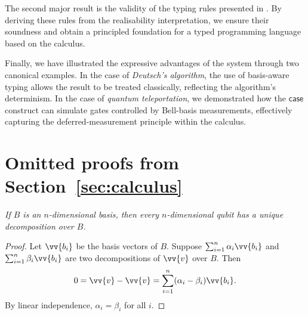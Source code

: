 \documentclass[runningheads,orivec,envcountsame,envcountsect]{llncs}
\begin{document}
The second major result is the validity of the typing rules presented in
.  
By deriving these rules from the realisability interpretation, we ensure their
soundness and obtain a principled foundation for a typed programming language
based on the calculus.

Finally, we have illustrated the expressive advantages of the system through two
canonical examples.  
In the case of \emph{Deutsch's algorithm}, the use of basis-aware typing allows
the result to be treated classically, reflecting the algorithm's determinism.  
In the case of \emph{quantum teleportation}, we demonstrated how the
$\mathsf{case}$ construct can simulate gates controlled by Bell-basis
measurements, effectively capturing the deferred-measurement principle within
the calculus.

%
%
%
%



\clearpage

\makeatletter
\renewcommand*\theHsection{\thesection}
\makeatother
\appendix

\section{Omitted proofs from Section~\ref{sec:calculus}}\label{sec:appendixA}

\begin{restatetheorem}
  \itshape
  If $B$ is an $n$-dimensional basis, then every $n$-dimensional qubit has
  a unique decomposition over $B$.
\end{restatetheorem}
\begin{proof}
  Let $\vv{b_i}$ be the basis vectors of $B$. Suppose
  $\sum_{i=1}^n \alpha_i \vv{b_i}$ and $\sum_{i=1}^n \beta_i \vv{b_i}$
  are two decompositions of $\vv{v}$ over $B$. Then
  \[
    0=\vv{v}-\vv{v}=\sum_{i=1}^{n}(\alpha_i-\beta_i)\vv{b_i}.
  \]
  By linear independence, $\alpha_i=\beta_i$ for all $i$.
\end{proof}
\end{document}
